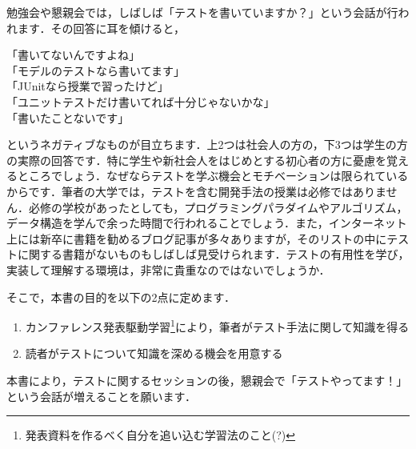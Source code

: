勉強会や懇親会では，しばしば「テストを書いていますか？」という会話が行われます．その回答に耳を傾けると，

\begin{screen}%
\noindent 「書いてないんですよね」 \\
「モデルのテストなら書いてます」 \\
「JUnitなら授業で習ったけど」 \\
「ユニットテストだけ書いてれば十分じゃないかな」 \\
「書いたことないです」
\end{screen}

\noindent というネガティブなものが目立ちます．上2つは社会人の方の，下3つは学生の方の実際の回答です．特に学生や新社会人をはじめとする初心者の方に憂慮を覚えるところでしょう．なぜならテストを学ぶ機会とモチベーションは限られているからです．筆者の大学では，テストを含む開発手法の授業は必修ではありません．必修の学校があったとしても，プログラミングパラダイムやアルゴリズム，データ構造を学んで余った時間で行われることでしょう．また，インターネット上には新卒に書籍を勧めるブログ記事が多々ありますが，そのリストの中にテストに関する書籍がないものもしばしば見受けられます．テストの有用性を学び，実装して理解する環境は，非常に貴重なのではないでしょうか．

そこで，本書の目的を以下の2点に定めます．

\begin{enumerate}
    \item カンファレンス発表駆動学習\footnote{発表資料を作るべく自分を追い込む学習法のこと(?)}により，筆者がテスト手法に関して知識を得る
    \item 読者がテストについて知識を深める機会を用意する
\end{enumerate}

\noindent 本書により，テストに関するセッションの後，懇親会で「テストやってます！」という会話が増えることを願います．

